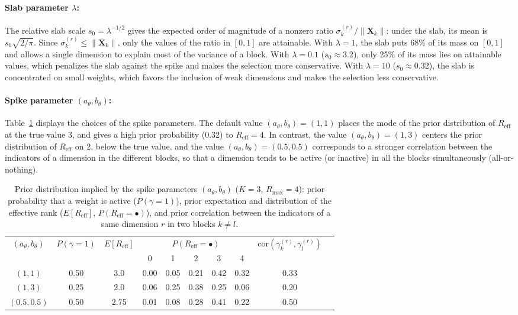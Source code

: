 \documentclass[11pt]{article}
\newcommand{\X}{\mathbf{X}}
\newcommand{\Reff}{R_{\mathrm{eff}}}
\begin{document}
\paragraph{Slab parameter $\lambda$:} The relative slab scale $s_0 = \lambda^{-1/2}$ gives the expected order of magnitude of a nonzero ratio $\sigma_k^{(r)}/\|\X_k\|$: under the slab, its mean is $s_0\sqrt{2/\pi}$. Since $\sigma_k^{(r)}\le\|\X_k\|$, only the values of the ratio in $[0,1]$ are attainable. With $\lambda=1$, the slab puts 68\% of its mass on $[0,1]$ and allows a single dimension to explain most of the variance of a block. With $\lambda=0.1$ ($s_0\approx 3.2$), only 25\% of its mass lies on attainable values, which penalizes the slab against the spike and makes the selection more conservative. With $\lambda=10$ ($s_0\approx 0.32$), the slab is concentrated on small weights, which favors the inclusion of weak dimensions and makes the selection less conservative.

\paragraph{Spike parameter $(a_\theta,b_\theta)$:} Table~\ref{tab:spike_param} displays the choices of the spike parameters. The default value $(a_\theta,b_\theta)=(1,1)$ places the mode of the prior distribution of $\Reff$ at the true value 3, and gives a high prior probability (0.32) to $\Reff=4$. In contrast, the value $(a_\theta,b_\theta)=(1,3)$ centers the prior distribution of $\Reff$ on 2, below the true value, and the value $(a_\theta,b_\theta)=(0.5,0.5)$ corresponds to a stronger correlation between the indicators of a dimension in the different blocks, so that a dimension tends to be active (or inactive) in all the blocks simultaneously (all-or-nothing).

\begin{table}
\centering
	\begin{tabular}{cccccccccc}
	\hline
	\multirow{2}{*}{$(a_\theta,b_\theta)$} & \multirow{2}{*}{$P(\gamma=1)$} & \multirow{2}{*}{$E[R_{\mathrm{eff}}]$} & \multicolumn{5}{c}{$P(R_{\mathrm{eff}}=\bullet)$} & \multirow{2}{*}{$\text{cor}(\gamma_k^{(r)},\gamma_l^{(r)})$} \\
	& & & 0 & 1 & 2 & 3 & 4 & \\
	\hline
	$(1,1)$ & 0.50 & 3.0 & 0.00 & 0.05 & 0.21 & 0.42 & 0.32 & 0.33 \\
	$(1,3)$ & 0.25 & 2.0 & 0.06 & 0.25 & 0.38 & 0.25 & 0.06 & 0.20 \\
	$(0.5,0.5)$ & 0.50 & 2.75 & 0.01 & 0.08 & 0.28 & 0.41 & 0.22 & 0.50 \\
	\hline
	\end{tabular}
	\caption{Prior distribution implied by the spike parameters $(a_\theta,b_\theta)$ ($K=3$, $R_{\max}=4$): prior probability that a weight is active ($P(\gamma=1)$), prior expectation and distribution of the effective rank ($E[R_{\mathrm{eff}}]$, $P(R_{\mathrm{eff}}=\bullet)$), and prior correlation between the indicators of a same dimension $r$ in two blocks $k\neq l$.\label{tab:spike_param}}  
\end{table}
\end{document}
